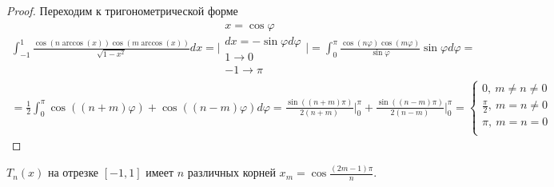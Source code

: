 \begin{proof}
  Переходим к тригонометрической форме
  \begin{multline*}
    \int_{-1}^{1}\frac{\cos(n\arccos(x))\cos(m\arccos(x))}{\sqrt{1-x^2}}dx
    =\Big|\substack{x=\cos\varphi \\
      dx = -\sin\varphi d\varphi\\
      1\rightarrow0 \\
      -1\rightarrow\pi
    }\Big|=\int_{0}^{\pi}\frac{\cos(n\varphi)\cos(m\varphi)}{\sin\varphi}\sin\varphi d\varphi = \\
    = \frac{1}{2}\int_0^{\pi}\cos((n+m)\varphi)+\cos((n-m)\varphi)d\varphi = \frac{\sin((n+m)\pi)}{2(n+m)}\Big|_0^{\pi}+\frac{\sin((n-m)\pi)}{2(n-m)}\Big|_0^{\pi}=\begin{cases}
      0,\ m\neq n\neq0         \\
      \frac{\pi}{2},\ m=n\neq0 \\
      \pi,\ m=n=0              \\
    \end{cases}
  \end{multline*}
\end{proof}


\begin{theorem}
  $T_n(x)$ на отрезке $[-1,1]$ имеет $n$ различных корней $x_m=\cos\frac{(2m-1)\pi}{n}$.
\end{theorem}

